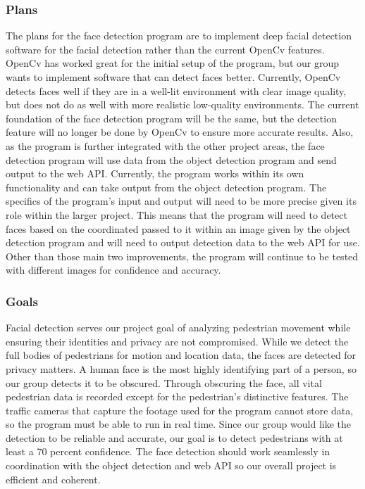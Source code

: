 \documentclass[onecolumn, draftclsnofoot,10pt, compsoc]{IEEEtran}
\begin{document}
\subsubsection{Plans}
The plans for the face detection program are to implement deep facial detection software for the facial detection rather than the current OpenCv features. OpenCv has worked great for the initial setup of the program, but our group wants to implement software that can detect faces better. Currently, OpenCv detects faces well if they are in a well-lit environment with clear image quality, but does not do as well with more realistic low-quality environments. The current foundation of the face detection program will be the same, but the detection feature will no longer be done by OpenCv to ensure more accurate results. Also, as the program is further integrated with the other project areas, the face detection program will use data from the object detection program and send output to the web API. Currently, the program works within its own functionality and can take output from the object detection program. The specifics of the program's input and output will need to be more precise given its role within the larger project. This means that the program will need to detect faces based on the coordinated passed to it within an image given by the object detection program and will need to output detection data to the web API for use. Other than those main two improvements, the program will continue to be tested with different images for confidence and accuracy.

\subsubsection{Goals}
Facial detection serves our project goal of analyzing pedestrian movement while ensuring their identities and privacy are not compromised. While we detect the full bodies of pedestrians for motion and location data, the faces are detected for privacy matters. A human face is the most highly identifying part of a person, so our group detects it to be obscured. Through obscuring the face, all vital pedestrian data is recorded except for the pedestrian's distinctive features. The traffic cameras that capture the footage used for the program cannot store data, so the program must be able to run in real time. Since our group would like the detection to be reliable and accurate, our goal is to detect pedestrians with at least a 70 percent confidence. The face detection should work seamlessly in coordination with the object detection and web API so our overall project is efficient and coherent.
\end{document}
